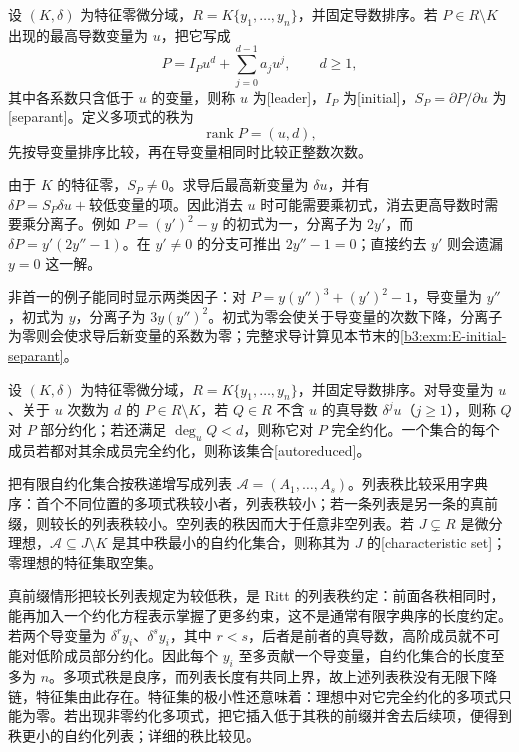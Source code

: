 \begin{definition}\label{b3:def:differential-leader}
	设 \((K,\delta)\) 为特征零微分域，\(R=K\{y_1,\ldots,y_n\}\)，并固定导数排序。若 \(P\in R\setminus K\) 出现的最高导数变量为 \(u\)，把它写成
	\[
		P=I_Pu^d+\sum_{j=0}^{d-1}a_ju^j,\qquad d\ge1,
	\]
	其中各系数只含低于 \(u\) 的变量，则称 \(u\) 为[leader]，\(I_P\) 为[initial]，\(S_P=\partial P/\partial u\) 为[separant]。定义多项式的秩为
	\[
		\operatorname{rank}P=(u,d),
	\]
	先按导变量排序比较，再在导变量相同时比较正整数次数。
\end{definition}

由于 \(K\) 的特征零，\(S_P\ne0\)。求导后最高新变量为 \(\delta u\)，并有 \(\delta P=S_P\delta u+\text{较低变量的项}\)。因此消去 \(u\) 时可能需要乘初式，消去更高导数时需要乘分离子。例如 \(P=(y')^2-y\) 的初式为一，分离子为 \(2y'\)，而 \(\delta P=y'(2y''-1)\)。在 \(y'\ne0\) 的分支可推出 \(2y''-1=0\)；直接约去 \(y'\) 则会遗漏 \(y=0\) 这一解。

非首一的例子能同时显示两类因子：对 \(P=y(y'')^3+(y')^2-1\)，导变量为 \(y''\)，初式为 \(y\)，分离子为 \(3y(y'')^2\)。初式为零会使关于导变量的次数下降，分离子为零则会使求导后新变量的系数为零；完整求导计算见本节末的\cref{b3:exm:E-initial-separant}。

\begin{definition}\label{b3:def:differential-characteristic-set}
	设 \((K,\delta)\) 为特征零微分域，\(R=K\{y_1,\ldots,y_n\}\)，并固定导数排序。对导变量为 \(u\)、关于 \(u\) 次数为 \(d\) 的 \(P\in R\setminus K\)，若 \(Q\in R\) 不含 \(u\) 的真导数 \(\delta^ju\)（\(j\ge1\)），则称 \(Q\) 对 \(P\) 部分约化；若还满足 \(\deg_uQ<d\)，则称它对 \(P\) 完全约化。一个集合的每个成员若都对其余成员完全约化，则称该集合[autoreduced]。

	把有限自约化集合按秩递增写成列表 \(\mathcal A=(A_1,\ldots,A_s)\)。列表秩比较采用字典序：首个不同位置的多项式秩较小者，列表秩较小；若一条列表是另一条的真前缀，则较长的列表秩较小。空列表的秩因而大于任意非空列表。若 \(J\subsetneq R\) 是微分理想，\(\mathcal A\subseteq J\setminus K\) 是其中秩最小的自约化集合，则称其为 \(J\) 的[characteristic set]；零理想的特征集取空集。
\end{definition}

真前缀情形把较长列表规定为较低秩，是 Ritt 的列表秩约定：前面各秩相同时，能再加入一个约化方程表示掌握了更多约束，这不是通常有限字典序的长度约定。若两个导变量为 \(\delta^ry_i\)、\(\delta^sy_i\)，其中 \(r<s\)，后者是前者的真导数，高阶成员就不可能对低阶成员部分约化。因此每个 \(y_i\) 至多贡献一个导变量，自约化集合的长度至多为 \(n\)。多项式秩是良序，而列表长度有共同上界，故上述列表秩没有无限下降链，特征集由此存在。特征集的极小性还意味着：理想中对它完全约化的多项式只能为零。若出现非零约化多项式，把它插入低于其秩的前缀并舍去后续项，便得到秩更小的自约化列表；详细的秩比较见\cite[Section 3.3, Proposition 3.15 and Definition 3.17]{Hubert2003DifferentialSystems}。

